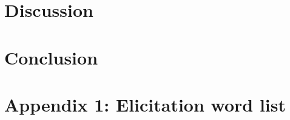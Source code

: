 \documentclass[12pt, letterpaper]{article}
\begin{document}
\section{Discussion} \label{sec:Discussion}



\section{Conclusion} \label{sec:Conclusions}



\printbibliography[heading=bibintoc]

\section*{Appendix 1: Elicitation word list}
\end{document}
